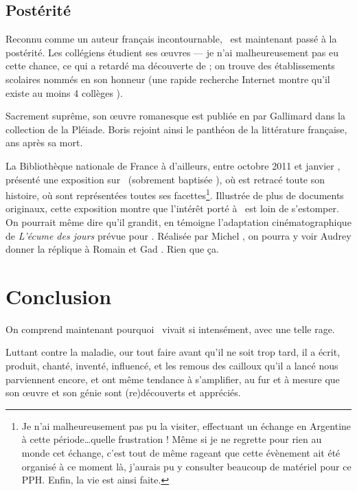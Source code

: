 \subsection{Postérité}
Reconnu comme un auteur français incontournable, \BV\ est maintenant passé à la postérité.
Les collégiens étudient ses \oe{}uvres --- je n'ai malheureusement pas eu cette chance,
ce qui a retardé ma découverte de \BV; on trouve des établissements scolaires nommés en
son honneur (une rapide recherche Internet montre qu'il existe au moins 4 collèges \BV).

Sacrement suprême, son \oe{}uvre romanesque est publiée en  par Gallimard dans la collection
de la Pléiade. Boris rejoint ainsi le panthéon de la littérature française,  ans après sa mort.

La Bibliothèque nationale de France à d'ailleurs, entre octobre 2011 et janvier , présenté
une exposition sur \BV\ (sobrement baptisée \emph{\BV}), où est retracé toute son histoire, où sont
représentées toutes ses facettes\footnote{Je n'ai malheureusement pas pu la visiter, effectuant un échange en Argentine à cette période\ldots quelle frustration ! Même si je ne regrette pour rien au monde cet échange, c'est tout de même rageant que cette évènement ait été organisé à ce moment là, j'aurais pu y consulter beaucoup de matériel pour ce PPH. Enfin, la vie est ainsi faite.}. Illustrée de plus de  documents originaux, cette
exposition montre que l'intérêt porté à \BV\ est loin de s'estomper. On pourrait même dire qu'il
grandit, en témoigne l'adaptation cinématographique de \emph{L'écume des jours} prévue pour .
Réalisée par Michel , on pourra y voir Audrey  donner la réplique à
Romain  et Gad . Rien que ça.




\section*{Conclusion}

On comprend maintenant pourquoi \BV\ vivait si intensément, avec une telle rage.

Luttant contre la maladie, our tout faire avant qu'il ne soit trop tard,
il a écrit, produit, chanté, inventé, influencé, et les remous des cailloux qu'il a lancé nous parviennent encore, et ont
même tendance à s'amplifier, au fur et à mesure que son \oe{}uvre et son génie sont (re)découverts et appréciés.


